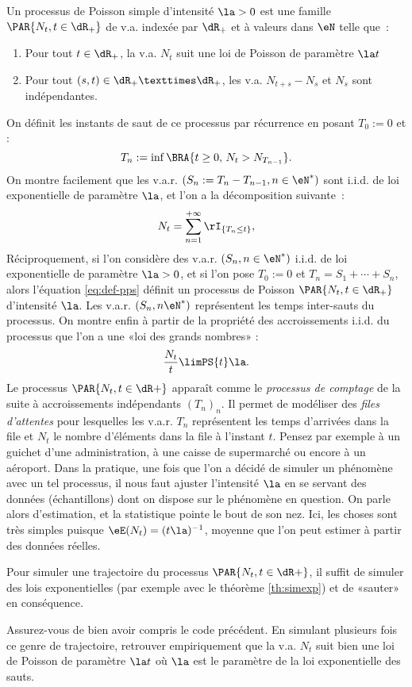 Un processus de Poisson simple d'intensité $\la>0$ est une famille
$\PAR{N_t,t\in\dR_+}$ de v.a. indexée par $\dR_+$ et à valeurs dans $\eN$
telle que~:
\begin{enumerate}
\item Pour tout $t\in\dR_+$, la v.a. $N_t$ suit une loi de Poisson de paramètre
  $\la t$
\item Pour tout $(s,t)\in\dR_+×\dR_+$, les v.a. $N_{t+s}-N_s$ et $N_s$ sont
  indépendantes.
\end{enumerate}
On définit les instants de saut de ce processus par récurrence en posant
$T_0:=0$ et :
$$
T_n:=\inf\BRA{t\geq 0,\,N_t>N_{T_{n-1}}}.
$$
On montre facilement que les v.a.r. $(S_n:=T_n-T_{n-1},n\in\eN^*)$ sont i.i.d.
de loi exponentielle de paramètre $\la$, et l'on a la décomposition suivante~:
\begin{equation}\label{eq:def-pps}
N_t=\sum_{n=1}^{+\infty} \rI_{\{T_n \leq t\}},
\end{equation}
Réciproquement, si l'on considère des v.a.r. $(S_n,n\in\eN^*)$ i.i.d. de loi
exponentielle de paramètre $\la>0$, et si l'on pose $T_0:=0$ et
$T_n=S_1+\cdots+S_n$, alors l'équation \eqref{eq:def-pps} définit un processus de
Poisson $\PAR{N_t,t\in\dR_+}$ d'intensité $\la$.  Les v.a.r. $(S_n,n\eN^*)$
représentent les temps inter-sauts du processus. On montre enfin à partir de
la propriété des accroissements i.i.d. du processus que l'on a une «loi des
grands nombres» :
\begin{equation}
\frac{N_t}{t} \limPS{t} \la.\label{eq:LGN-ppoiss}
\end{equation}
Le processus $\PAR{N_t,t\in\dR+}$ apparaît comme le \emph{processus de comptage}
de la suite à accroissements indépendants $(T_n)_n$. Il permet de modéliser
des \emph{files d'attentes} pour lesquelles les v.a.r. $T_n$ représentent les
temps d'arrivées dans la file et $N_t$ le nombre d'éléments dans la file à
l'instant $t$. Pensez par exemple à un guichet d'une administration, à une
caisse de supermarché ou encore à un aéroport. Dans la pratique, une fois que
l'on a décidé de simuler un phénomène avec un tel processus, il nous faut
ajuster l'intensité $\la$ en se servant des données (échantillons) dont on
dispose sur le phénomène en question. On parle alors d'estimation, et la
statistique pointe le bout de son nez. Ici, les choses sont très simples
puisque $\eE(N_t)=(t\la)^{-1}$, moyenne que l'on peut estimer à partir des
données réelles.

Pour simuler une trajectoire du processus $\PAR{N_t,t\in\dR+}$, il suffit de
simuler des lois exponentielles (par exemple avec le théorème \ref{th:simexp})
et de «sauter» en conséquence. 
\begin{exo}
  Assurez-vous de bien avoir compris le code précédent.  En simulant plusieurs
  fois ce genre de trajectoire, retrouver empiriquement que la v.a. $N_t$ suit
  bien une loi de Poisson de paramètre $\la t$ où $\la$ est le paramètre de la
  loi exponentielle des sauts.
\end{exo}

